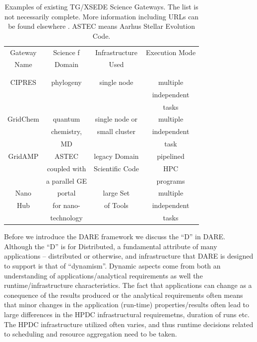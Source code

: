\documentclass[]{svjour3}
\begin{document}
\begin{table}
\centering
 \small
\begin{tabular}{|c|c|c|c|} 
  \hline Gateway  & Science f & Infrastructure & Execution Mode 
  \\
  Name & Domain & Used & \\ 
  &  &  & \\
  & & & \\  \hline \hline 
  
  CIPRES   & phylogeny  &  single node  & multiple  \\
   &  &   & independent   \\ 
  &  &  &  tasks \\  \hline
  GridChem   & quantum & single node or     & multiple  \\
     & chemistry, & small cluster & independent   \\
  & MD &  & task  \\ \hline
   GridAMP     & ASTEC  & legacy Domain  & pipelined \\ 
  & coupled with  &  Scientific Code   & HPC  \\
  & a parallel GE &   &  programs \\ \hline
  Nano  & portal  & large Set   & multiple \\
  Hub  & for nano- & of Tools  & independent \\
   & technology &  & tasks \\ \hline
  \hline
\end{tabular} \caption{Examples of existing TG/XSEDE Science Gateways. The list is not necessarily complete. More information including URLs can be found elsewhere \cite{tg-sg-list-url}. ASTEC means Aarhus Stellar Evolution Code.}
 \label{table:TG-sg} 
\end{table}

Before we introduce the DARE framework we discuss the ``D'' in
DARE. Although the ``D'' is for Distributed, a fundamental attribute
of many applications -- distributed or otherwise, and infrastructure
that DARE is designed to support is that of ``dynamism''.  Dynamic
aspects come from both an understanding of applications/analytical
requirements as well the runtime/infrastructure characteristics.  The
fact that applications can change as a conequence of the results
produced or the analytical requirements often means that minor changes
in the application (run-time) properties/results often lead to large
differences in the HPDC infrastructural requiremetns, duration of runs
etc.  The HPDC infrastructure utilized often varies, and thus runtime
decisions related to scheduling and resource aggregation need to be
taken.
\end{document}
